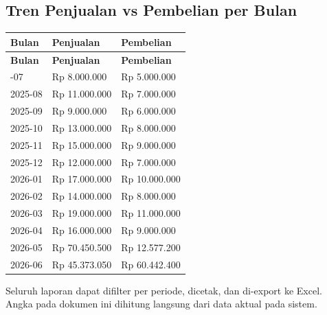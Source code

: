 \documentclass[11pt,a4paper]{article}
\begin{document}
\subsection{Tren Penjualan vs Pembelian per Bulan}
{\setlength{\tabcolsep}{5pt}
\begin{longtable}{l R{4cm} R{4cm}}
\toprule
\textbf{Bulan} & \textbf{Penjualan} & \textbf{Pembelian} \\
\midrule\endfirsthead
\toprule
\textbf{Bulan} & \textbf{Penjualan} & \textbf{Pembelian} \\
\midrule\endhead
\bottomrule{}-07 & Rp 8.000.000 & Rp 5.000.000 \\
2025-08 & Rp 11.000.000 & Rp 7.000.000 \\
2025-09 & Rp 9.000.000 & Rp 6.000.000 \\
2025-10 & Rp 13.000.000 & Rp 8.000.000 \\
2025-11 & Rp 15.000.000 & Rp 9.000.000 \\
2025-12 & Rp 12.000.000 & Rp 7.000.000 \\
2026-01 & Rp 17.000.000 & Rp 10.000.000 \\
2026-02 & Rp 14.000.000 & Rp 8.000.000 \\
2026-03 & Rp 19.000.000 & Rp 11.000.000 \\
2026-04 & Rp 16.000.000 & Rp 9.000.000 \\
2026-05 & Rp 70.450.500 & Rp 12.577.200 \\
2026-06 & Rp 45.373.050 & Rp 60.442.400 \\
\end{longtable}}

\vfill
\begin{center}\color{grey}\small Seluruh laporan dapat difilter per periode, dicetak, dan di-export ke Excel. Angka pada dokumen ini dihitung langsung dari data aktual pada sistem.\end{center}
\end{document}
